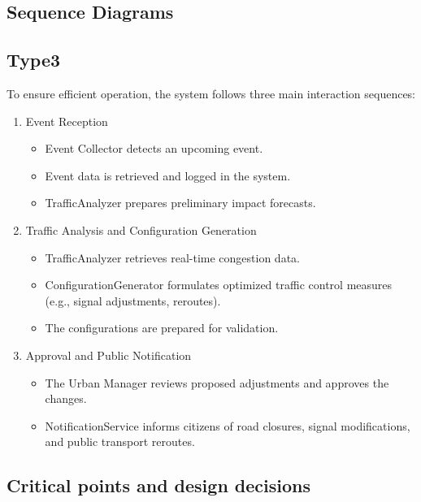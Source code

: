 \documentclass[a4paper,12pt]{article}
\begin{document}
\newpage

\subsection{Sequence Diagrams}
\subsection*{Type3}
To ensure efficient operation, the system follows three main interaction sequences:

\begin{enumerate}
    \item {Event Reception}
    \begin{itemize}
        \item Event Collector detects an upcoming event.
        \item Event data is retrieved and logged in the system.
        \item TrafficAnalyzer prepares preliminary impact forecasts.
    \end{itemize}
    \item {Traffic Analysis and Configuration Generation}
    \begin{itemize}
        \item TrafficAnalyzer retrieves real-time congestion data.
        \item ConfigurationGenerator formulates optimized traffic control measures (e.g., signal adjustments, reroutes).
        \item The configurations are prepared for validation.
    \end{itemize}
    \item {Approval and Public Notification}
    \begin{itemize}
        \item The Urban Manager reviews proposed adjustments and approves the changes.
        \item NotificationService informs citizens of road closures, signal modifications, and public transport reroutes.
    \end{itemize}
\end{enumerate}

\newpage

\subsection{Critical points and design decisions}
\end{document}
